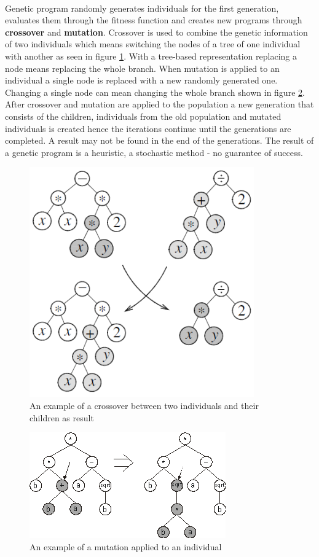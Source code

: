 \paragraph{}
Genetic program randomly generates individuals for the first generation, evaluates them through the 
fitness function and creates new programs through \textbf{crossover} and \textbf{mutation}. Crossover 
is used to combine the genetic information of two individuals which means switching the nodes of a tree of one individual
with another as seen in figure \ref{fig:cross}. With a tree-based representation replacing a node means replacing the whole branch. When mutation
is applied to an individual a single node is replaced with a new randomly generated one. Changing a single
node can mean changing the whole branch shown in figure \ref{fig:mut}. After crossover and mutation are applied to the population a new generation
that consists of the children, individuals from the old population and mutated individuals is created
hence the iterations continue until the generations are completed. A result may not be found in the end of the generations.
The result of a genetic program is a heuristic, a stochastic method - no guarantee of success.
\begin{figure}[htp]
\centering
\includegraphics[scale=0.8]{Figures/crossover.png}
\caption{An example of a crossover between two individuals and their children as result}
\label{fig:cross}
\end{figure}

\begin{figure}[htp]
\centering
\includegraphics[scale=1.2]{Figures/mutation.png}
\caption{An example of a mutation applied to an individual}
\label{fig:mut}
\end{figure}

